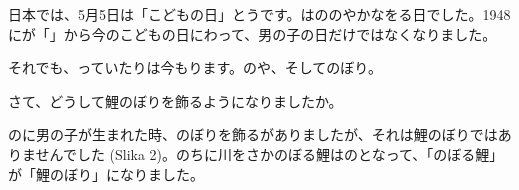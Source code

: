 
\author{autor}


	\begin{bunshou}
		\hspace{15pt}日本では、5月5日は「こどもの日」とう\hspace{5pt}です。は\hspace{10pt}ののやかなを\hspace{10pt}る日でした。\hspace{5pt}1948にが「」から今のこどもの日にわって、男の子の日だけではなくなりました。

		それでも、\hspace{10pt}っていたりは今もります。\hspace{5pt}の\hspace{10pt}や\hspace{10pt}、そしてのぼり。
	\end{bunshou}

	\fukudai{teži dio}
	\begin{bunshou}
		さて、どうして鯉のぼりを飾るようになりましたか。

		のに男の子が生まれた時、のぼりを飾るがありましたが、それは鯉のぼりではありませんでした (Slika 2)。のちに川をさかのぼる鯉はの\hspace{10pt}となって、「のぼる鯉」が「鯉のぼり」になりました。
	\end{bunshou}

